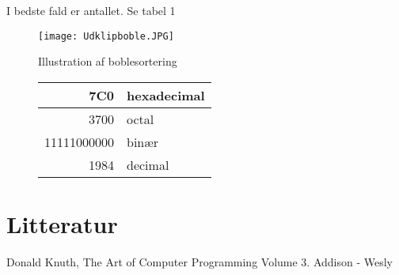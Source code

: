\documentclass{article}
\begin{document}
I bedste fald er antallet. Se tabel 1



\begin{figure}[H]
    \centering
     \label{fig:my_label}
\texttt{[image: Udklipboble.JPG]}
\caption{Illustration af boblesortering}
\end{figure}


\begin{figure}[H]
\centering
\begin{tabular}{|r|l|}
\hline
7C0 & hexadecimal\\
\hline
3700 & octal\\
\hline
11111000000 & binær\\
\hline
1984 & decimal\\
\hline

\end{tabular}    
\end{figure}



\section{Litteratur}


\begin{thebibliography}{1}

Donald Knuth,
The Art of Computer Programming
Volume 3. Addison - Wesly




\end{thebibliography}
\end{document}

